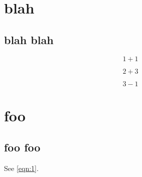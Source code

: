 \documentclass{scrreprt}
\begin{document}
\chapter{blah}
\section{blah blah}

\begin{dmath}\label{eqn:1}
1 + 1
\end{dmath}

\begin{dmath}\label{eqn:2}
2 + 3
\end{dmath}

\begin{dmath}\label{eqn:3}
3 - 1
\end{dmath}

\chapter{foo}
\section{foo foo}

See \cref{eqn:1}.
\end{document}

